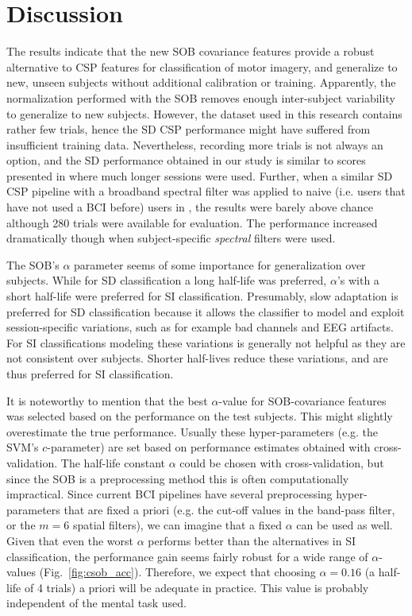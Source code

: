 \section{Discussion}
The results indicate that the new \acl{SOB} covariance features provide a
robust alternative to \ac{CSP} features for classification of motor imagery,
and generalize to new, unseen subjects without additional calibration or
training. Apparently, the normalization performed with the \ac{SOB} removes
enough inter-subject variability to generalize to new subjects.
%
However, the dataset used in this research contains rather few trials, hence
the \ac{SD} \ac{CSP} performance might have suffered from insufficient training
data. Nevertheless, recording more trials is not always an option, and the
\ac{SD} performance obtained in our study is similar to scores presented in
\cite{fazli2009sim} where much longer sessions were used. Further, when a
similar \ac{SD} \ac{CSP} pipeline with a broadband spectral filter was applied
to naive (i.e. users that have not used a \ac{BCI} before) users in
\cite{blankertz2008bbc}, the results were barely above chance although
280 trials were available for evaluation. The performance increased
dramatically though when subject-specific \emph{spectral} filters were used. 

The \ac{SOB}'s $\alpha$ parameter seems of some importance for generalization
over subjects. While for \ac{SD} classification a long half-life was preferred,
$\alpha$'s with a short half-life were preferred for \ac{SI} classification.
%
Presumably, slow adaptation is preferred for \ac{SD} classification because it
allows the classifier to model and exploit session-specific variations, such as
for example bad channels and \ac{EEG} artifacts. For \ac{SI} classifications
modeling these variations is generally not helpful as they are not consistent
over subjects. Shorter half-lives reduce these variations, and are thus
preferred for \ac{SI} classification.
 
\begin{sloppypar}
It is noteworthy to mention that the best $\alpha$-value for
\ac{SOB}-covariance features was selected based on the performance on
the test subjects. This might slightly overestimate the true performance. 
%
Usually these hyper-parameters (e.g. the \ac{SVM}'s $c$-parameter) are set
based on performance estimates obtained with cross-validation. The half-life
constant $\alpha$ could be chosen with cross-validation, but since the \ac{SOB}
is a preprocessing method this is often computationally impractical.
%
Since current \ac{BCI} pipelines have several preprocessing hyper-parameters
that are fixed a priori (e.g. the cut-off values in the band-pass filter, or
the $m=6$ spatial filters), we can imagine that a fixed $\alpha$ can be used as
well. Given that even the worst $\alpha$ performs better than the alternatives
in \ac{SI} classification, the performance gain seems fairly robust for a wide
range of $\alpha$-values (Fig.~\ref{fig:csob_acc}). Therefore, we expect that
choosing $\alpha=0.16$ (a half-life of 4 trials) a priori will be adequate in
practice. This value is probably independent of the mental task used.
\end{sloppypar}
